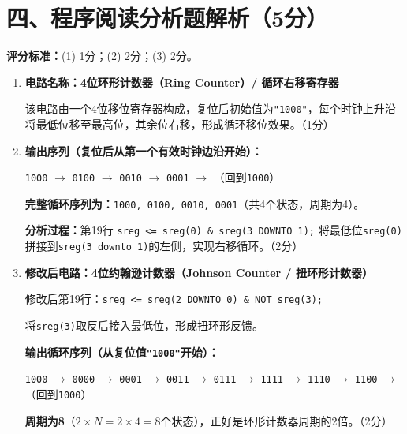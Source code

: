 \section{四、程序阅读分析题解析（5分）}

\begin{framed}
\textbf{评分标准：}(1) 1分；(2) 2分；(3) 2分。
\end{framed}

\begin{enumerate}[label=(\arabic*)]

\item \textbf{电路名称：4位环形计数器（Ring Counter）/ 循环右移寄存器}

该电路由一个4位移位寄存器构成，复位后初始值为\texttt{"1000"}，每个时钟上升沿将最低位移至最高位，其余位右移，形成循环移位效果。（1分）

\item \textbf{输出序列（复位后从第一个有效时钟边沿开始）：}

\vspace{0.3cm}
\begin{center}
\texttt{1000} $\rightarrow$ \texttt{0100} $\rightarrow$ \texttt{0010} $\rightarrow$ \texttt{0001} $\rightarrow$ （回到\texttt{1000}）
\end{center}
\vspace{0.3cm}

\textbf{完整循环序列为：}\texttt{1000, 0100, 0010, 0001}（共4个状态，周期为4）。

\textbf{分析过程：}第19行 \texttt{sreg <= sreg(0) \& sreg(3 DOWNTO 1);} 将最低位\texttt{sreg(0)}拼接到\texttt{sreg(3 downto 1)}的左侧，实现右移循环。（2分）

\item \textbf{修改后电路：4位约翰逊计数器（Johnson Counter / 扭环形计数器）}

修改后第19行：\texttt{sreg <= sreg(2 DOWNTO 0) \& NOT sreg(3);}

将\texttt{sreg(3)}取反后接入最低位，形成扭环形反馈。

\textbf{输出循环序列（从复位值\texttt{"1000"}开始）：}

\vspace{0.3cm}
\begin{center}
\texttt{1000} $\rightarrow$ \texttt{0000} $\rightarrow$ \texttt{0001} $\rightarrow$ \texttt{0011} $\rightarrow$ \texttt{0111} $\rightarrow$ \texttt{1111} $\rightarrow$ \texttt{1110} $\rightarrow$ \texttt{1100} $\rightarrow$ （回到\texttt{1000}）
\end{center}
\vspace{0.3cm}

\textbf{周期为8}（$2\times N = 2\times 4 = 8$个状态），正好是环形计数器周期的2倍。（2分）

\end{enumerate}

